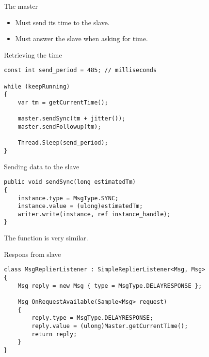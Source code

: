 \documentclass[compressed, presentation, notheorems, 12pt]{beamer}
\begin{document}
	\begin{frame}{The master}
	\begin{itemize}
		\item Must send its time to the slave.
		\item Must answer the slave when asking for time.
	\end{itemize}
	\end{frame}


	\begin{frame}[containsverbatim]{Retrieving the time}
	\begin{lstlisting}[style=Code-C++]
const int send_period = 485; // milliseconds

while (keepRunning)
{
	var tm = getCurrentTime();

	master.sendSync(tm + jitter());
	master.sendFollowup(tm);						

	Thread.Sleep(send_period);
}
	\end{lstlisting}
	\end{frame}

 	

	\begin{frame}[containsverbatim]{Sending data to the slave}
	\begin{lstlisting}[style=Code-C++]
public void sendSync(long estimatedTm)
{
	instance.type = MsgType.SYNC;
	instance.value = (ulong)estimatedTm;
	writer.write(instance, ref instance_handle);
}
	\end{lstlisting}

	The function  is very similar.
	\end{frame}



	\begin{frame}[containsverbatim]{Respons from slave}
	\begin{lstlisting}[style=Code-C++]
class MsgReplierListener : SimpleReplierListener<Msg, Msg>
{
	Msg reply = new Msg { type = MsgType.DELAYRESPONSE };

	Msg OnRequestAvailable(Sample<Msg> request)
	{
		reply.type = MsgType.DELAYRESPONSE;
		reply.value = (ulong)Master.getCurrentTime();
		return reply;
	}
}
	\end{lstlisting}

	\end{frame}
\end{document}
